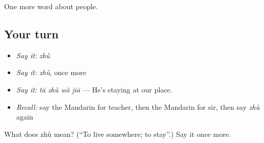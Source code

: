 \begin{grammarlens}[title={What you've built}]
One more word about people.
\end{grammarlens}

\subsection*{Your turn}
\begin{itemize}
\raggedright
  \item \emph{Say it:} \emph{zhù}
  \item \emph{Say it:} \emph{zhù}, once more
  \item \emph{Say it:} \emph{tā zhù wǒ jiā} — He's staying at our place.
  \item \emph{Recall:} say the Mandarin for teacher, then the Mandarin for sir, then say \emph{zhù} again
\end{itemize}

\begin{tcolorbox}[breakable,colback=teal!4,colframe=teal!35!black,title={Before you move on}]
What does zhù mean? (\textquotedblleft{}To live somewhere; to stay\textquotedblright{}.) Say it once more.
\end{tcolorbox}
